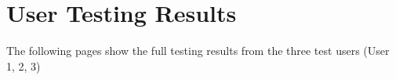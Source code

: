 \chapter{User Testing Results}
\label{app:testing}
The following pages show the full testing results from the three test users (User 1, 2, 3)


